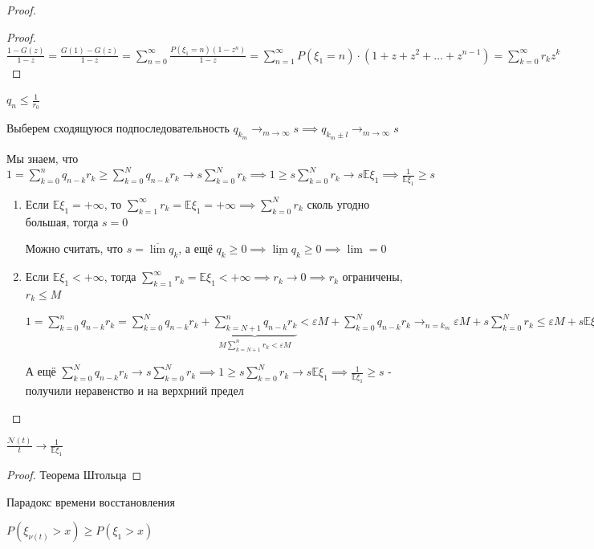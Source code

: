 \begin{proof}
\begin{proof}
        $\frac{1 - G(z)}{1 - z} = \frac{G(1) - G(z)}{1 - z} = \sum\limits_{n = 0}^\infty \frac{P(\xi_1 = n) (1 - z^n)}{1 - z} = \sum\limits_{n = 1}^\infty P(\xi_1 = n) \cdot (1 + z + z^2 + \ldots + z^{n - 1}) = \sum\limits_{k = 0}^\infty r_k z^k$
    \end{proof}

    \begin{consequence}
        $q_n \leqslant \frac{1}{r_0}$
    \end{consequence}

    Выберем сходящуюся подпоследовательность $q_{k_m} \rightarrow_{m \to \infty} s \implies q_{k_{m} \pm l} \rightarrow_{m \to \infty} s$

    Мы знаем, что $1 = \sum\limits_{k = 0}^n q_{n - k}r_k \geqslant \sum\limits_{k = 0}^N q_{n - k}r_k \rightarrow s \sum\limits_{k = 0}^N r_k \implies 1 \geqslant s \sum\limits_{k = 0}^N r_k \rightarrow s \mathbb{E} \xi_1 \implies \frac{1}{\mathbb{E} \xi_1} \geqslant s$

    \begin{enumerate}
        \item {
            Если $\mathbb{E} \xi_1 = +\infty$, то $\sum\limits_{k = 1}^\infty r_k = \mathbb{E} \xi_1 = +\infty \implies \sum\limits_{k = 0}^N r_k$ сколь угодно большая, тогда $s = 0$

            Можно считать, что $s = \overline{\lim} q_k$, а ещё $q_k \geqslant 0 \implies \underline{\lim} q_k \geqslant 0 \implies \lim = 0$
        }
        \item {
            Если $\mathbb{E} \xi_1 < +\infty$, тогда $\sum\limits_{k = 1}^\infty r_k = \mathbb{E} \xi_1 < +\infty \implies r_k \rightarrow 0 \implies r_k$ ограничены, $r_k \leqslant M$

            $1 = \sum\limits_{k = 0}^n q_{n - k} r_k = \sum\limits_{k = 0}^N q_{n - k} r_k + \underbrace{\sum\limits_{k = N + 1}^n q_{n - k}r_k}_{M \sum\limits_{k = N + 1}^n r_k < \varepsilon M} < \varepsilon M + \sum\limits_{k = 0}^N q_{n - k}r_k 
            \rightarrow_{n = k_m} \varepsilon M + s\sum\limits_{k = 0}^N r_k \leqslant \varepsilon M + s\mathbb{E} \xi_1 \implies 1 \leqslant s \mathbb{E} \xi_1 \implies \underline{\lim} \geqslant \frac{1}{\mathbb{E} \xi_1}$ 

            А ещё $\sum\limits_{k = 0}^N q_{n - k}r_k \rightarrow s \sum\limits_{k = 0}^N r_k \implies 1 \geqslant s \sum\limits_{k = 0}^N r_k \rightarrow s \mathbb{E} \xi_1 \implies \frac{1}{\mathbb{E} \xi_1} \geqslant s$ - получили неравенство и на верхрний предел
        }
    \end{enumerate}
\end{proof}

\begin{consequence}
    $\frac{\mathcal{N} (t)}{t} \rightarrow \frac{1}{\mathbb{E} \xi_1}$
\end{consequence}

\begin{proof}
    Теорема Штольца
\end{proof}

\begin{remark}
    Парадокс времени восстановления

    $P(\xi_{\nu (t)} > x) \geqslant P(\xi_1 > x)$
\end{remark}